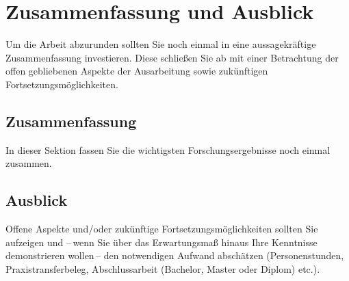 \chapter{Zusammenfassung und Ausblick}\label{chap:Conclusion}
Um die Arbeit abzurunden sollten Sie noch einmal in eine aussagekräftige Zusammenfassung investieren. Diese schließen Sie ab mit einer Betrachtung der offen gebliebenen Aspekte der Ausarbeitung sowie zukünftigen Fortsetzungsmöglichkeiten.

\section{Zusammenfassung}\label{sec:Conclusion:Summary}
In dieser Sektion fassen Sie die wichtigsten Forschungsergebnisse noch einmal zusammen. 

\section{Ausblick}\label{sec:Conclusion:FutureWork}
Offene Aspekte und/oder zukünftige Fortsetzungsmöglichkeiten sollten Sie aufzeigen und --\,wenn Sie über das Erwartungsmaß hinaus Ihre Kenntnisse demonstrieren wollen\,-- den notwendigen Aufwand abschätzen (Personenstunden, Praxistransferbeleg, Abschlussarbeit (Bachelor, Master oder Diplom) etc.).

%
\label{contentPages:End}